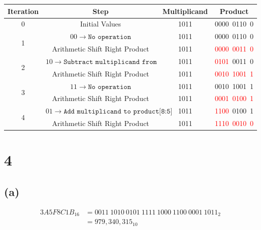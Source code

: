 \documentclass[12pt]{article}
\begin{document}
\begin{table}[h!]
    \centering
        \begin{tabular}{|c|c|c|c|}
        \hline
        \textbf{Iteration} & \textbf{Step} & \textbf{Multiplicand} & \textbf{Product}  \\
         \hline
            0 & Initial Values & 1011 & 0000\ 0110\ 0 \\
            \hline
            \multirow{2}{*}{1} 
             & $00\rightarrow\texttt{No operation}$ & 1011 & 0000\ 0110\ 0 \\
            \cline{2-4}
             & Arithmetic Shift Right Product & 1011 & \textcolor{red}{0000\ 0011\ 0} \\
            \hline
            \multirow{2}{*}{2}
             & $10\rightarrow\texttt{Subtract multiplicand from product[8:5]}$ & 1011 & \textcolor{red}{0101}\ 0011\ 0 \\
            \cline{2-4}
             & Arithmetic Shift Right Product & 1011 & \textcolor{red}{0010\ 1001\ 1} \\
            \hline
            \multirow{2}{*}{3}
             & $11\rightarrow\texttt{No operation}$ & 1011 & 0010\ 1001\ 1 \\
            \cline{2-4}
             & Arithmetic Shift Right Product & 1011 & \textcolor{red}{0001\ 0100\ 1} \\
            \hline
            \multirow{2}{*}{4}
             & $01\rightarrow\texttt{Add multiplicand to product[8:5]}$ & 1011 & \textcolor{red}{1100}\ 0100\ 1 \\     \cline{2-4}
             & Arithmetic Shift Right Product & 1011 & \textcolor{red}{1110\ 0010\ 0} \\
            \hline
        \end{tabular}
\end{table}

\section*{4}

\subsection*{(a)}

\begin{align*}
3A5F8C1B_{16} &= 0011\ 1010\ 0101\ 1111\ 1000\ 1100\ 0001\ 1011_{2} \\
&= 979,340,315_{10}
\end{align*}
\end{document}
